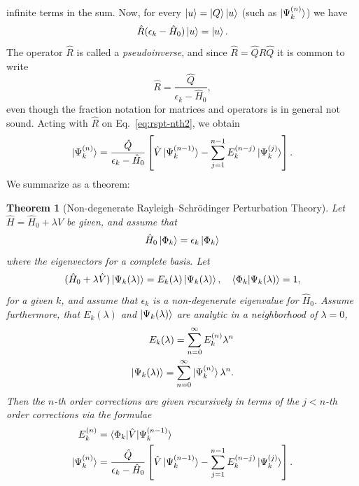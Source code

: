 \documentclass{report}
\theoremstyle{plain}
\newtheorem{theorem}{Theorem}[chapter]
\theoremstyle{definition}
\begin{document}
infinite terms in the sum. Now,
for every $\ket{u} = \ket{Q}\ket{u}$ (such as
$\ket{\Psi_k^{(n)}}$) we have
\begin{equation}
  \hat{R} (\epsilon_k - \hat{H}_0)\ket{u} = \ket{u}.
\end{equation}
The operator $\hat{R}$ is called a \emph{pseudoinverse}, and since
$\hat{R} = \hat{Q} \hat{R}\hat{Q}$ it is
common to write
\begin{equation}
  \hat{R} = \frac{\hat{Q}}{\epsilon_k - \hat{H}_0},
\end{equation}
even though the fraction notation for matrices and operators is in general not sound.
Acting with
$\hat{R}$ on Eq.~\eqref{eq:rspt-nth2}, we obtain
\begin{equation}
  \ket{\Psi_k^{(n)}} = \frac{\hat{Q}}{\epsilon_k - \hat{H}_0 } \left[
    \hat{V} \ket{\Psi_k^{(n-1)}} - \sum_{j=1}^{n-1} E_k^{(n-j)}
    \ket{\Psi_k^{(j)}} \right].
\end{equation}
We summarize as a theorem:
\begin{theorem}[Non-degenerate Rayleigh--Schr\"odinger Perturbation Theory]
  \label{thm:rspt}
  Let $\hat{H} = \hat{H}_0 + \lambda \hat{V}$ be given, and assume
  that
  \begin{equation}
    \hat{H}_0 \ket{\Phi_k} = \epsilon_k \ket{\Phi_k}
  \end{equation}
  where the eigenvectors for a complete basis. Let
  \begin{equation}
    (\hat{H}_0 + \lambda \hat{V}) \ket{\Psi_k(\lambda)} = E_k(\lambda)
    \ket{\Psi_k(\lambda)}, \quad \braket{\Phi_k|\Psi_k(\lambda)} = 1,
  \end{equation}
  for a given $k$, and assume that $\epsilon_k$ is a non-degenerate
  eigenvalue for $\hat{H}_0$. Assume furthermore, that $E_k(\lambda)$
  and $\ket{\Psi_k(\lambda)}$ are analytic in a neighborhood of
  $\lambda = 0$,
  \begin{align}
    E_k(\lambda) = \sum_{n=0}^\infty E_k^{(n)}\lambda^n\\
    \ket{\Psi_k(\lambda)} = \sum_{n=0}^\infty \ket{\Psi_k^{(n)}}\lambda^n.
  \end{align}
  Then the $n$-th order corrections are given recursively in terms
  of the $j<n$-th order corrections via the formulae
  \begin{align}
    E_k^{(n)} &= \braket{\Phi_k|\hat{V}|\Psi_k^{(n-1)}} \\
    \ket{\Psi_k^{(n)}} &=  \frac{\hat{Q}}{\epsilon_k - \hat{H}_0} \left[
      \hat{V} \ket{\Psi_k^{(n-1)}} - \sum_{j=1}^{n-1} E_k^{(n-j)}
      \ket{\Psi_k^{(j)}} \right].
  \end{align}
\end{theorem}
\end{document}
